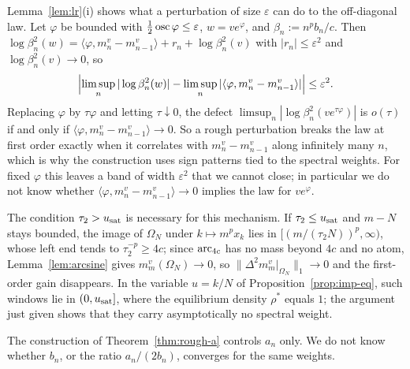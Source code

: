 \begin{remark}\label{rem:accuracy}
Lemma~\ref{lem:lr}(i) shows what a perturbation of size $\varepsilon$ can do to the off-diagonal law. Let $\varphi$ be
bounded with $\frac12\operatorname{osc}\varphi\le\varepsilon$, $w=ve^\varphi$, and $\beta_n:=n^pb_n/c$. Then
$\log\beta_n^2(w)=\langle\varphi,m^v_n-m^v_{n-1}\rangle+r_n+\log\beta_n^2(v)$ with $|r_n|\le\varepsilon^2$ and
$\log\beta_n^2(v)\to0$, so
\[
  \Bigl|\limsup_n|\log\beta_n^2(w)|-\limsup_n|\langle\varphi,m^v_n-m^v_{n-1}\rangle|\Bigr|\le\varepsilon^2 .
\]
Replacing $\varphi$ by $\tau\varphi$ and letting $\tau\downarrow0$, the defect $\limsup_n|\log\beta_n^2(ve^{\tau\varphi})|$
is $o(\tau)$ if and only if $\langle\varphi,m^v_n-m^v_{n-1}\rangle\to0$. So a rough perturbation breaks the law at
first order exactly when it correlates with $m^v_n-m^v_{n-1}$ along infinitely many $n$, which is why the construction
uses sign patterns tied to the spectral weights. For fixed $\varphi$ this leaves a band of width $\varepsilon^2$ that we
cannot close; in particular we do not know whether $\langle\varphi,m_n^v-m_{n-1}^v\rangle\to0$ implies the law for
$ve^\varphi$.
\end{remark}

\begin{remark}[admissibility]\label{rem:admissible}
The condition $\tau_2>u_{\mathrm{sat}}$ is necessary for this mechanism. If $\tau_2\le u_{\mathrm{sat}}$ and $m-N$ stays bounded, the image
of $\Omega_N$ under $k\mapsto m^px_k$ lies in $[(m/(\tau_2N))^p,\infty)$, whose left end tends to $\tau_2^{-p}\ge4c$; since
$\operatorname{arc}_{4c}$ has no mass beyond $4c$ and no atom, Lemma~\ref{lem:arcsine} gives $m^v_m(\Omega_N)\to0$, so
$\|\Delta^2m^v_m|_{\Omega_N}\|_1\to0$ and the first-order gain disappears. In the variable $u=k/N$ of Proposition~\ref{prop:imp-eq},
such windows lie in $(0,u_{\mathrm{sat}}]$, where the equilibrium density $\rho^*$ equals $1$; the argument just given shows that
they carry asymptotically no spectral weight.
\end{remark}

\begin{remark}\label{rem:rough-ab}
The construction of Theorem~\ref{thm:rough-a} controls $a_n$ only. We do not know whether $b_n$, or the ratio
$a_n/(2b_n)$, converges for the same weights.
\end{remark}
